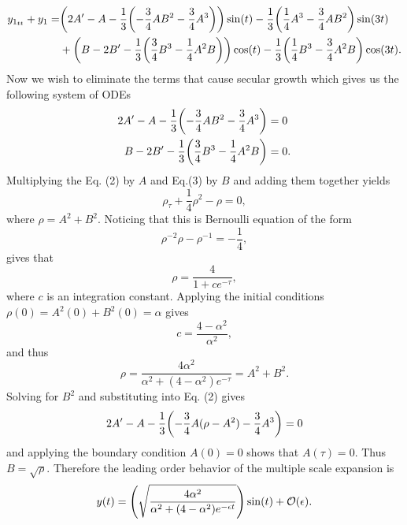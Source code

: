 \documentclass[12pt]{report}
\begin{document}
\begin{solution}
\begin{enumerate}
        \begin{align*}
            y_{1_{tt}} + y_1 = &{\left(2A' - A - \frac{1}{3}{\left(-\frac{3}{4}AB^2 - \frac{3}{4}A^3\right)}\right)}\sin(t)-\frac{1}{3}{\left(\frac{1}{4}A^3 - \frac{3}{4}AB^2\right)}\sin(3t)\\
            &+{\left(B-2B'-\frac{1}{3}{\left(\frac{3}{4}B^3-\frac{1}{4}A^2B\right)}\right)}\cos(t)-\frac{1}{3}{\left(\frac{1}{4}B^3 - \frac{3}{4}A^2B\right)}\cos(3t).\\
        \end{align*}
        Now we wish to eliminate the terms that cause secular growth which gives us the following system of ODEs
        \begin{align}
            2A' - A - \frac{1}{3}{\left(-\frac{3}{4}AB^2 - \frac{3}{4}A^3\right)} &= 0\\
            B-2B'-\frac{1}{3}{\left(\frac{3}{4}B^3-\frac{1}{4}A^2B\right)} &= 0.
        \end{align}
        Multiplying the Eq. (2) by $A$ and Eq.(3) by $B$ and adding them together yields
        \[ 
            \rho_\tau + \frac{1}{4}\rho^2 - \rho = 0,
        \]  
        where $\rho = A^2 + B^2$. Noticing that this is Bernoulli equation of the form
        \[ 
            \rho^{-2}\rho - \rho^{-1} = -\frac{1}{4},
        \]
        gives that
        \[ 
            \rho = \frac{4}{1 + c e^{-\tau}},
        \]
        where $c$ is an integration constant. Applying the initial conditions $\rho(0) = A^2(0) + B^2(0) = \alpha$ gives 
        \[ 
            c = \frac{4 - \alpha^2}{\alpha^2},
        \]
        and thus
        \[ 
            \rho = \frac{4\alpha^2}{\alpha^2 + (4-\alpha^2)e^{-\tau}} = A^2 + B^2.
        \]
        Solving for $B^2$ and substituting into Eq. (2) gives
        \[ 
            2A' - A - \frac{1}{3}{\left(-\frac{3}{4}A(\rho - A^2) - \frac{3}{4}A^3\right)} = 0
        \]
        and applying the boundary condition $A(0) = 0$ shows that $A(\tau) = 0$. Thus $B = \sqrt{\rho}$.  Therefore the leading order behavior of the multiple scale expansion is
        \[ 
            y(t) = {\left(\sqrt{\frac{4\alpha^2}{\alpha^2 + (4-\alpha^2)e^{-{\epsilon} t}}}\right)}\sin(t) + {\mathcal{O}}({\epsilon}).
        \] 


\end{enumerate}
\end{solution}
\end{document}
